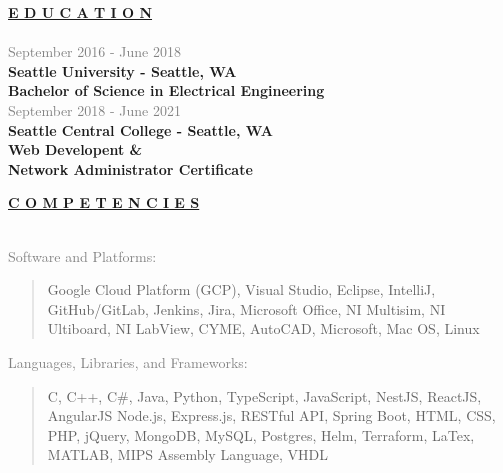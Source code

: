 \documentclass[letterpage]{article}
\begin{document}
\begin{minipage}[t]{0.424\linewidth}
\vspace{3pt}
\textbf{\fontsize{14px}{1px}\selectfont
  \ul{E D U C A T I O N}
}\\
\vspace{5px}\\
\textcolor{gray}{September 2016 - June 2018}\\
\textbf{\textsf{Seattle University - Seattle, WA}}\\
\textbf{Bachelor of Science in Electrical Engineering}\\

\textcolor{gray}{September 2018 - June 2021}\\
\textbf{\textsf{Seattle Central College - Seattle, WA}}\\
\textbf{Web Developent \& }\\
\textbf{Network Administrator Certificate}\\
\vspace{8px}

\textbf{\fontsize{14px}{1px}\selectfont
  \ul{C O M P E T E N C I E S}
}\\
\vspace{-5px}\\
\begin{minipage}[t]{0.01\linewidth}
  \end{minipage}
  \: %

  \vspace{1px}
  \textcolor{gray}{Software and Platforms:}\\
  \begin{quote}
      \textmd{Google Cloud Platform (GCP), Visual Studio, Eclipse, IntelliJ, GitHub/GitLab, Jenkins, Jira, Microsoft Office, NI
      Multisim, NI Ultiboard, NI LabView, CYME, AutoCAD, Microsoft, Mac OS,
      Linux}\\
  \end{quote}

  \vspace{7px}
  \textcolor{gray}{Languages, Libraries, and Frameworks:} \\ 
  \begin{quote}
    \textmd{C, C++, C\#, Java, Python, TypeScript, JavaScript, NestJS, ReactJS, AngularJS Node.js, Express.js, RESTful API, Spring Boot,  HTML, CSS, PHP, jQuery,
    MongoDB, MySQL, Postgres, Helm, Terraform,  LaTex, MATLAB, MIPS Assembly
    Language, VHDL}\\
  \end{quote}


\end{minipage}
\end{document}
